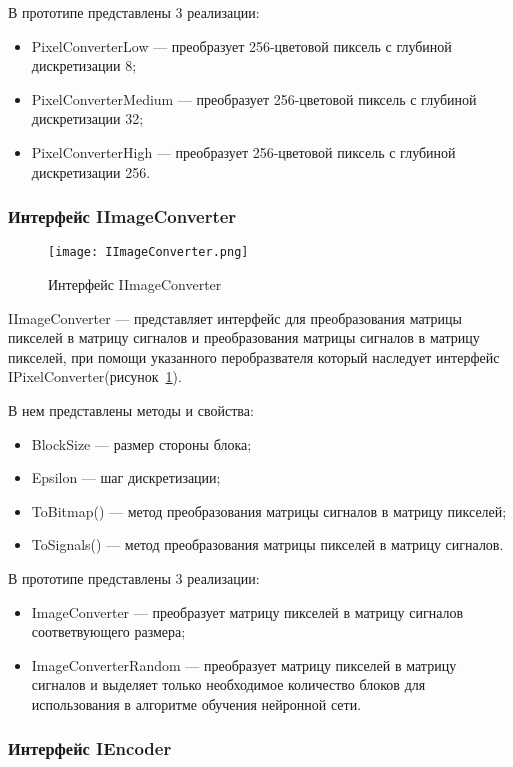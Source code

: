 В прототипе представлены 3 реализации:
\begin{itemize}
  \item PixelConverterLow --- преобразует 256-цветовой пиксель с глубиной дискретизации 8;
  \item PixelConverterMedium --- преобразует 256-цветовой пиксель с глубиной дискретизации 32;
  \item PixelConverterHigh --- преобразует 256-цветовой пиксель с глубиной дискретизации 256.
\end{itemize}

\subsubsection{Интерфейс IImageConverter}
\label{subsub:development:types:iimageconverter}

\begin{figure}[ht]
\centering
  \texttt{[image: IImageConverter.png]}
  \caption{ Интерфейс IImageConverter }
  \label{fig:iimageconverter}
\end{figure}
IImageConverter --- представляет интерфейс для преобразования матрицы пикселей в матрицу сигналов и
преобразования матрицы сигналов в матрицу пикселей, при помощи указанного перобразвателя который наследует интерфейс IPixelConverter(рисунок~\ref{fig:iimageconverter}).

В нем представлены методы и свойства:
\begin{itemize}
  \item BlockSize --- размер стороны блока;
  \item Epsilon --- шаг дискретизации;
  \item ToBitmap() --- метод преобразования матрицы сигналов в матрицу пикселей;
  \item ToSignals() --- метод преобразования матрицы пикселей в матрицу сигналов.
\end{itemize}

В прототипе представлены 3 реализации:
\begin{itemize}
  \item ImageConverter --- преобразует матрицу пикселей в матрицу сигналов соответвующего размера;
  \item ImageConverterRandom --- преобразует матрицу пикселей в матрицу сигналов и выделяет только необходимое
  количество блоков для использования в алгоритме обучения нейронной сети.
\end{itemize}

\subsubsection{Интерфейс IEncoder}
\label{subsub:development:types:iencoder}

